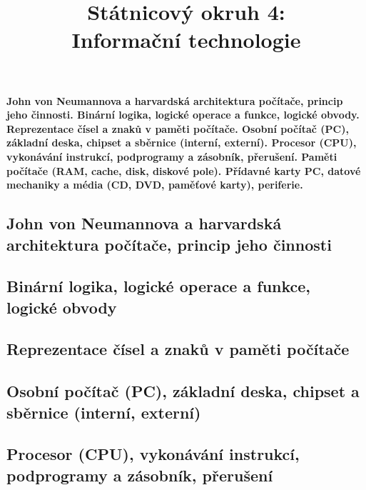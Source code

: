 \documentclass[10pt,a4paper]{article}
\begin{document}
\title{Státnicový okruh 4: \\ Informační technologie}
\maketitle
\newpage
\tableofcontents
\newpage
\section{}
\paragraph{John von Neumannova a harvardská architektura počítače, princip jeho činnosti. Binární logika, logické operace a funkce, logické obvody. Reprezentace čísel a znaků v paměti počítače. Osobní počítač (PC), základní deska, chipset a sběrnice (interní, externí). Procesor (CPU), vykonávání instrukcí, podprogramy a zásobník, přerušení. Paměti počítače (RAM, cache, disk, diskové pole). Přídavné karty PC, datové mechaniky a média (CD, DVD, paměťové karty), periferie.}

\subsection{John von Neumannova a harvardská architektura počítače, princip jeho činnosti}

\subsection{Binární logika, logické operace a funkce, logické obvody}

\subsection{Reprezentace čísel a znaků v paměti počítače}

\subsection{Osobní počítač (PC), základní deska, chipset a sběrnice (interní, externí)}

\subsection{Procesor (CPU), vykonávání instrukcí, podprogramy a zásobník, přerušení}
\end{document}
